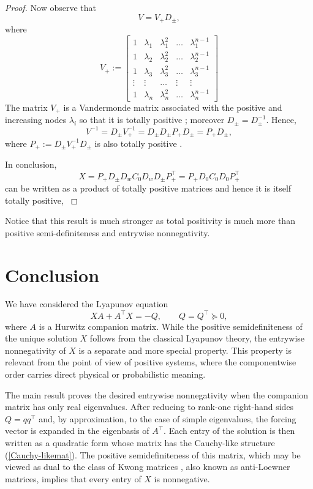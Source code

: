 \documentclass[12pt]{article}
\newcommand{\tp}{^{\top}}
\def\bmat{\left[ \begin{array}}
\def\emat{\end{array} \right]}
\begin{document}
\begin{proof}
Now observe that
 $$V=V_+D_{\pm},$$
where 
$$
V_+:=\bmat{cccccc}
1&\lambda_1 & \lambda_1^2 &\dots & \lambda_1^{n-1}\\
1& \lambda_2 & \lambda_2^2 &\dots & \lambda_2^{n-1}\\
1& \lambda_3 & \lambda_3^2 &\dots & \lambda_3^{n-1}\\
\vdots&\vdots&\dots&\vdots&\vdots\\
1& \lambda_n & \lambda_n^2 &\dots & \lambda_n^{n-1}
\emat$$
The matrix  $V_+$ is a Vandermonde matrix associated with the positive and increasing nodes $\lambda_i$ so that it  is totally positive \cite[Section 4.2]{Pinkus-TPM}; moreover  $D_{\pm}=D_{\pm}^{-1}$.
Hence,
$$V^{-1}=D_{\pm}V_+^{-1}=D_{\pm}D_{\pm}P_+ D_{\pm}=P_+ D_{\pm},$$
 where $P_+:=D_{\pm}V_+^{-1} D_{\pm}$ is also totally positive
 \cite[Proposition 1.6]{Pinkus-TPM}.

In conclusion,
$$
X=P_+ D_{\pm} D_w C_0 D_w D_{\pm} P_+\tp = P_+ D_0 C_0 D_0 P_+\tp
$$ 
can be written as a product of totally positive matrices and hence it is itself  totally positive, \cite[Proposition 1.4]{Pinkus-TPM}
\end{proof}



\begin{remark}
Notice that this result is much stronger as total positivity is much more than positive semi-definiteness and entrywise nonnegativity. 
\end{remark}  

\section{Conclusion}

We have considered the Lyapunov equation
\[
XA+A\tp X=-Q,
\qquad Q=Q\tp\succeq0,
\]
where $A$ is a Hurwitz companion matrix.  While the positive
semidefiniteness of the unique solution $X$ follows from the classical
Lyapunov theory, the entrywise nonnegativity of $X$ is a separate and more
special property.  This property is relevant from the point of view of
positive systems, where the componentwise order carries direct physical or
probabilistic meaning.

The main result proves the desired entrywise nonnegativity when the companion
matrix has only real eigenvalues.  After reducing to rank-one right-hand
sides $Q=qq\tp$ and, by approximation, to the case of simple eigenvalues, the
forcing vector is expanded in the eigenbasis of $A\tp$.  Each entry of the
solution is then written as a quadratic form whose matrix has the Cauchy-like
structure (\ref{Cauchy-likemat}).
The positive semidefiniteness of this matrix, which may be viewed as dual to the class of Kwong matrices \cite{Kwong1989,BhatiaSano2009,BhatiaJain2023}, also known as anti-Loewner matrices, implies that every entry of \(X\) is nonnegative.
\end{document}
